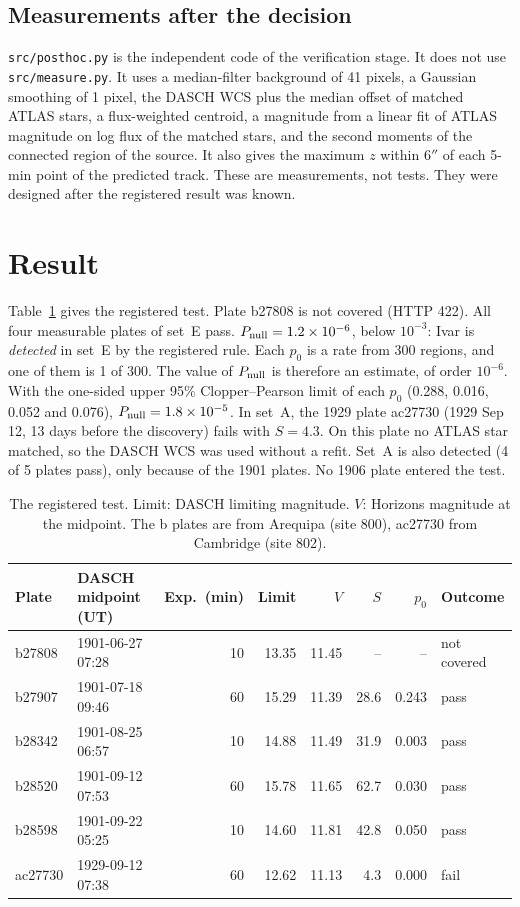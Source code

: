 \documentclass[11pt]{article}
\newcommand{\as}{$''$}
\begin{document}
\subsection{Measurements after the decision}
\texttt{src/posthoc.py} is the independent code of the verification stage. It does not use \texttt{src/measure.py}. It uses a median-filter background of 41 pixels, a Gaussian smoothing of 1 pixel, the DASCH WCS plus the median offset of matched ATLAS stars, a flux-weighted centroid, a magnitude from a linear fit of ATLAS magnitude on log flux of the matched stars, and the second moments of the connected region of the source. It also gives the maximum $z$ within 6\as{} of each 5-min point of the predicted track. These are measurements, not tests. They were designed after the registered result was known.

\section{Result}
Table~\ref{tab:result} gives the registered test. Plate b27808 is not covered (HTTP 422). All four measurable plates of set~E pass. $P_{\rm null}=1.2\times10^{-6}$, below $10^{-3}$: Ivar is \emph{detected} in set~E by the registered rule. Each $p_0$ is a rate from 300 regions, and one of them is 1 of 300. The value of $P_{\rm null}$ is therefore an estimate, of order $10^{-6}$. With the one-sided upper 95\% Clopper--Pearson limit of each $p_0$ (0.288, 0.016, 0.052 and 0.076), $P_{\rm null}=1.8\times10^{-5}$. In set~A, the 1929 plate ac27730 (1929 Sep 12, 13 days before the discovery) fails with $S=4.3$. On this plate no ATLAS star matched, so the DASCH WCS was used without a refit. Set~A is also detected (4 of 5 plates pass), only because of the 1901 plates. No 1906 plate entered the test.

\begin{table}[h]
\centering\small
\begin{tabular}{llrrrrrl}\toprule
Plate & DASCH midpoint (UT) & Exp.\ (min) & Limit & $V$ & $S$ & $p_0$ & Outcome \\\midrule
b27808 & 1901-06-27 07:28 & 10 & 13.35 & 11.45 & -- & -- & not covered \\
b27907 & 1901-07-18 09:46 & 60 & 15.29 & 11.39 & 28.6 & 0.243 & pass \\
b28342 & 1901-08-25 06:57 & 10 & 14.88 & 11.49 & 31.9 & 0.003 & pass \\
b28520 & 1901-09-12 07:53 & 60 & 15.78 & 11.65 & 62.7 & 0.030 & pass \\
b28598 & 1901-09-22 05:25 & 10 & 14.60 & 11.81 & 42.8 & 0.050 & pass \\
ac27730 & 1929-09-12 07:38 & 60 & 12.62 & 11.13 & 4.3 & 0.000 & fail \\\bottomrule
\end{tabular}
\caption{The registered test. Limit: DASCH limiting magnitude. $V$: Horizons magnitude at the midpoint. The b plates are from Arequipa (site 800), ac27730 from Cambridge (site 802).}
\label{tab:result}
\end{table}
\end{document}

